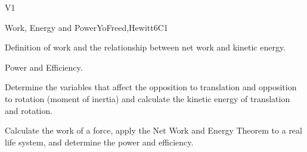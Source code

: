 \begin{syllabus}
\begin{specificoutcomes}{V1}
   \item {}
   \item {}
   \item {}
   \item {}
   \item {}
   \item {}
   \item {}
   \item {}
   \item {}
   \item {}
   \item {}
   \item {}
   \item {}
   \item {}
   \item {}
\end{specificoutcomes}

\begin{unit}{Work, Energy and Power}{}{YoFreed,Hewitt}{6}{C1}
   \begin{topics}
      \item Definition of work and the relationship between net work and kinetic energy.
      \item Power and Efficiency.
   \end{topics}
   
   \begin{learningoutcomes}
      \item Determine the variables that affect the opposition to translation and opposition to rotation (moment of inertia) and calculate the kinetic energy of translation and rotation.
      \item Calculate the work of a force, apply the Net Work and Energy Theorem to a real life system, and determine the power and efficiency.
   \end{learningoutcomes}
\end{unit}
   

\end{syllabus}
